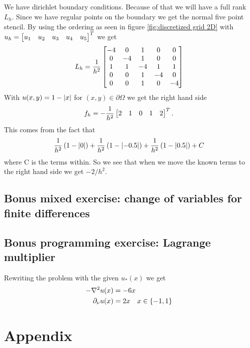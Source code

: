 \documentclass{homework}
\begin{document}
\subsection{}
We have dirichlet boundary conditions. Because of that we will have a full rank $L_h$. Since we have regular points on the boundary we get the normal five point stencil. By using the ordering as seen in figure \eqref{fig:discretized grid 2D} with $u_h=\begin{bmatrix}u_1&u_2&u_3&u_4&u_5\end{bmatrix}^T$ we get
\begin{align*}
    L_h = \frac{1}{h^2}\begin{bmatrix}-4&0&1&0&0\\0&-4&1&0&0\\1&1&-4&1&1\\0&0&1&-4&0\\0&0&1&0&-4\end{bmatrix}
\end{align*}
With $u(x,y) = 1-\abs{x}$ for $(x,y)\in\partial\Omega$ we get the right hand side
\begin{align*}
    f_h = -\frac{1}{h^2}\begin{bmatrix}
        2&
        1&
        0&
        1&
        2
    \end{bmatrix}^T.
\end{align*}
This comes from the fact that 
\newcommand{\abx}[1]{\abs{#1}}
\begin{align*}
    \frac{1}{h^2}\left(1-\abs{0}\right) + \frac{1}{h^2}\left(1-\abs{-0.5}\right) + \frac{1}{h^2}\left(1-\abs{0.5}\right) + C
\end{align*}
where C is the terms within. So we see that when we move the known terms to the right hand side we get $-2/h^2$.
\subsection{Bonus mixed exercise: change of variables for finite differences}

\subsection{Bonus programming exercise: Lagrange multiplier}
Rewriting the problem with the given $u_*(x)$ we get
\begin{align*}
    -\nabla^2u(x) &= -6x\\
    \partial_\nu u(x) &= 2x \hspace{1em} x\in \left\{-1,1\right\}
\end{align*}

\clearpage
\section*{Appendix}
\end{document}
